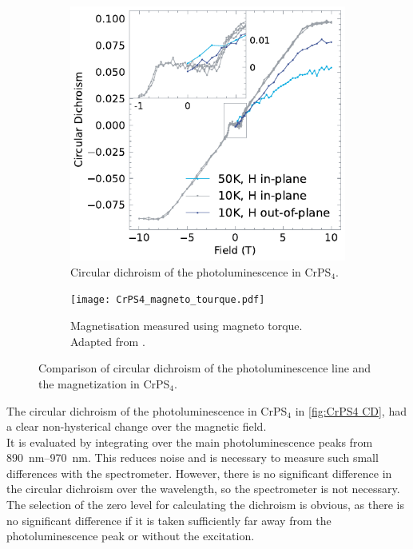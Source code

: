 \documentclass[
	oneside,
	parskip=half,
	a4paper,
]{scrbook}
\begin{document}
\begin{figure}
	\begin{subfigure}[t]{3.5in}
		\vskip 0pt
		\includegraphics{../figures/2023-12-14 CrPS4 circular dichroism.pdf}
		\caption{Circular dichroism of the photoluminescence in CrPS$_4$.}
		\label{fig:CrPS4 CD}
	\end{subfigure}
	\begin{subfigure}[t]{2.5in}
		\vskip 0pt
		\texttt{[image: CrPS4\_magneto\_tourque.pdf]}
		\caption{Magnetisation measured using magneto torque. Adapted from \cite[Figure 2]{CrPS4_magnetic}.}
		\label{fig:CrPS4 magnetic}
	\end{subfigure}
	\caption{Comparison of circular dichroism of the photoluminescence line and the magnetization in CrPS$_4$.}
\end{figure}
The circular dichroism of the photoluminescence in CrPS$_4$ in \autoref{fig:CrPS4 CD},
had a clear non-hysterical change over the magnetic field.\\
It is evaluated by integrating over the main photoluminescence peaks from \SIrange{890}{970}{nm}.
This reduces noise and is necessary to measure such small differences with the spectrometer.
However, there is no significant difference in the circular dichroism over the wavelength, so the spectrometer is not necessary.
The selection of the zero level for calculating the dichroism is obvious, as there is no significant difference if it is taken sufficiently far away from the photoluminescence peak or without the excitation.
\end{document}

